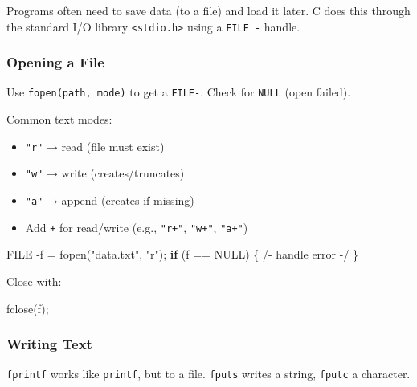 \documentclass[
  letterpaper,
  DIV=11,
  numbers=noendperiod]{scrreprt}
\newenvironment{Shaded}{\begin{snugshade}}{\end{snugshade}}
\newcommand{\ControlFlowTok}[1]{\textcolor[rgb]{0.00,0.23,0.31}{\textbf{#1}}}
\newcommand{\DataTypeTok}[1]{\textcolor[rgb]{0.68,0.00,0.00}{#1}}
\newcommand{\NormalTok}[1]{\textcolor[rgb]{0.00,0.23,0.31}{#1}}
\newcommand{\OperatorTok}[1]{\textcolor[rgb]{0.37,0.37,0.37}{#1}}
\newcommand{\StringTok}[1]{\textcolor[rgb]{0.13,0.47,0.30}{#1}}
\providecommand{\tightlist}{%
  \setlength{\itemsep}{0pt}\setlength{\parskip}{0pt}}
\begin{document}
Programs often need to save data (to a file) and load it later. C does
this through the standard I/O library
\texttt{\textless{}stdio.h\textgreater{}} using a \texttt{FILE\ -}
handle.

\subsubsection{Opening a File}\label{opening-a-file}

Use \texttt{fopen(path,\ mode)} to get a \texttt{FILE-}. Check for
\texttt{NULL} (open failed).

Common text modes:

\begin{itemize}
\tightlist
\item
  \texttt{"r"} → read (file must exist)
\item
  \texttt{"w"} → write (creates/truncates)
\item
  \texttt{"a"} → append (creates if missing)
\item
  Add \texttt{+} for read/write (e.g., \texttt{"r+"}, \texttt{"w+"},
  \texttt{"a+"})
\end{itemize}

\begin{Shaded}
\begin{Highlighting}[]
\DataTypeTok{FILE} \OperatorTok{{-}}\NormalTok{f }\OperatorTok{=}\NormalTok{ fopen}\OperatorTok{(}\StringTok{"data.txt"}\OperatorTok{,} \StringTok{"r"}\OperatorTok{);}
\ControlFlowTok{if} \OperatorTok{(}\NormalTok{f }\OperatorTok{==}\NormalTok{ NULL}\OperatorTok{)} \OperatorTok{\{} \OperatorTok{/{-}}\NormalTok{ handle error }\OperatorTok{{-}/} \OperatorTok{\}}
\end{Highlighting}
\end{Shaded}

Close with:

\begin{Shaded}
\begin{Highlighting}[]
\NormalTok{fclose}\OperatorTok{(}\NormalTok{f}\OperatorTok{);}
\end{Highlighting}
\end{Shaded}

\subsubsection{Writing Text}\label{writing-text}

\texttt{fprintf} works like \texttt{printf}, but to a file.
\texttt{fputs} writes a string, \texttt{fputc} a character.
\end{document}

